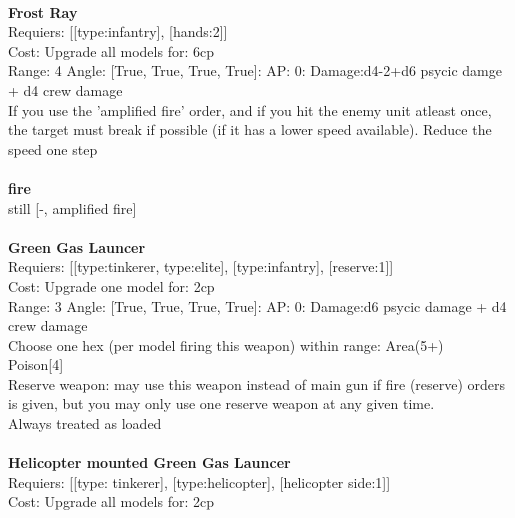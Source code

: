 \ \\
{\bf Frost Ray } \\

Requiers: [[type:infantry], [hands:2]] \\
Cost: Upgrade all models for: 6cp \\


Range: 4  Angle: [True, True, True, True]: AP: 0: Damage:d4-2+d6 psycic damge + d4 crew damage \\
If you use the 'amplified fire' order, and if you hit the enemy unit atleast once, the target must break if possible (if it has a lower speed available). Reduce the speed one step\\ 







\ \\ {\bf fire } \\
still [-, amplified fire] \\

\ \\
{\bf Green Gas Launcer } \\

Requiers: [[type:tinkerer, type:elite], [type:infantry], [reserve:1]] \\
Cost: Upgrade one model for: 2cp \\


Range: 3  Angle: [True, True, True, True]: AP: 0: Damage:d6 psycic damage + d4 crew damage \\
Choose one hex (per model firing this weapon) within range: Area(5+)\\ 
Poison[4]\\ 
Reserve weapon: may use this weapon instead of main gun if fire (reserve) orders is given, but you may only use one reserve weapon at any given time.\\ 
Always treated as loaded\\ 








\ \\
{\bf Helicopter mounted Green Gas Launcer } \\

Requiers: [[type: tinkerer], [type:helicopter], [helicopter side:1]] \\
Cost: Upgrade all models for: 2cp \\


